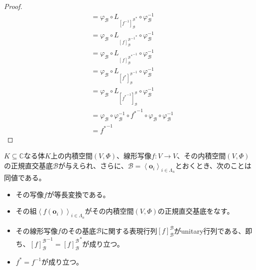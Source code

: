 \documentclass[dvipdfmx]{jsarticle}
\begin{document}
\begin{proof}
\begin{align*}
&= \varphi_{\mathcal{B}} \circ L_{{\left[ f^{- 1} \right]_{\mathcal{B}}^{\mathcal{B}}}^{*}} \circ \varphi_{\mathcal{B}}^{- 1}\\
&= \varphi_{\mathcal{B}} \circ L_{{{[ f]_{\mathcal{B}}^{\mathcal{B}}}^{- 1}}^{*}} \circ \varphi_{\mathcal{B}}^{- 1}\\
&= \varphi_{\mathcal{B}} \circ L_{{{[ f]_{\mathcal{B}}^{\mathcal{B}}}^{*}}^{- 1}} \circ \varphi_{\mathcal{B}}^{- 1}\\
&= \varphi_{\mathcal{B}} \circ L_{{\left[ f^{*} \right]_{\mathcal{B}}^{\mathcal{B}}}^{- 1}} \circ \varphi_{\mathcal{B}}^{- 1}\\
&= \varphi_{\mathcal{B}} \circ L_{\left[ {f^{*}}^{- 1} \right]_{\mathcal{B}}^{\mathcal{B}}} \circ \varphi_{\mathcal{B}}^{- 1}\\
&= \varphi_{\mathcal{B}} \circ \varphi_{\mathcal{B}}^{- 1} \circ {f^{*}}^{- 1} \circ \varphi_{\mathcal{B}} \circ \varphi_{\mathcal{B}}^{- 1}\\
&= {f^{*}}^{- 1}
\end{align*}
\end{proof}
\begin{thm}\label{2.3.8.7}
$K \subseteq \mathbb{C}$なる体$K$上の内積空間$(V,\varPhi)$、線形写像$f:V \rightarrow V$、その内積空間$(V,\varPhi)$の正規直交基底$\mathcal{B}$が与えられ、さらに、$\mathcal{B}=\left\langle \mathbf{o}_{i} \right\rangle_{i \in \varLambda_{n}}$とおくとき、次のことは同値である。
\begin{itemize}
\item
  その写像$f$が等長変換である。
\item
  その組$\left\langle f\left( \mathbf{o}_{i} \right) \right\rangle_{i \in \varLambda_{n}}$がその内積空間$(V,\varPhi)$の正規直交基底をなす。
\item
  その線形写像$f$のその基底$\mathcal{B}$に関する表現行列$[ f]_{\mathcal{B}}^{\mathcal{B}}$がunitary行列である、即ち、${[ f]_{\mathcal{B}}^{\mathcal{B}}}^{- 1} = {[ f]_{\mathcal{B}}^{\mathcal{B}}}^{*}$が成り立つ。
\item
  $f^{*} = f^{- 1}$が成り立つ。
\end{itemize}
\end{thm}
\end{document}
